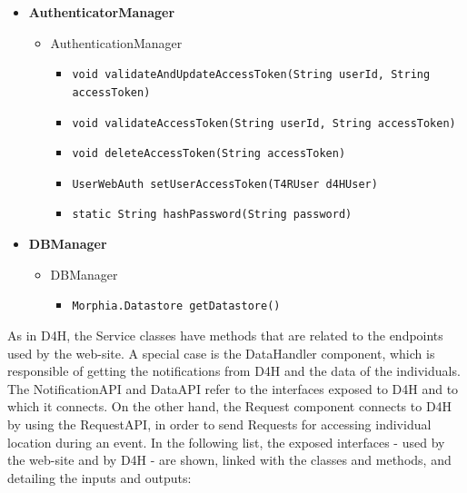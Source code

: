 \documentclass[a4paper, hidelinks, 12pt]{report}
\begin{document}
\begin{itemize}
\begin{itemize}
\begin{itemize}
					\end{itemize}
			\end{itemize}
		\item{\textbf{AuthenticatorManager}}
			\begin{itemize}
				\item{AuthenticationManager}
					\begin{itemize}
						\item{\verb|void validateAndUpdateAccessToken(String userId, String accessToken)|}
						\item{\verb|void validateAccessToken(String userId, String accessToken)|}
						\item{\verb|void deleteAccessToken(String accessToken)|}
						\item{\verb|UserWebAuth setUserAccessToken(T4RUser d4HUser)|}
						\item{\verb|static String hashPassword(String password)|}
					\end{itemize}
			\end{itemize}
		\item{\textbf{DBManager}}
			\begin{itemize}
				\item{DBManager}
					\begin{itemize}
						\item{\verb|Morphia.Datastore getDatastore()|}
					\end{itemize}
			\end{itemize}
	\end{itemize}
	As in D4H, the Service classes have methods that are related to the endpoints used by the web-site. A special case is the DataHandler component, which is responsible of getting the notifications from D4H and the data of the individuals. The  NotificationAPI and DataAPI refer to the interfaces exposed to D4H and to which it connects. On the other hand, the Request component connects to D4H by using the RequestAPI, in order to send Requests for accessing individual location during an event. In the following list, the exposed interfaces - used by the web-site and by D4H - are shown, linked with the classes and methods, and detailing the inputs and outputs:
	
\end{document}
